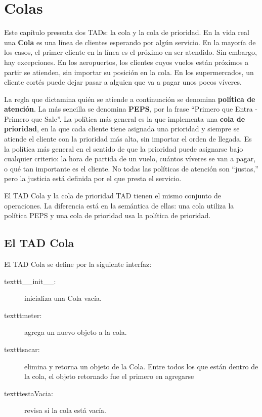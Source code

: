 
\chapter{Colas}

\label{Cola}   
  

Este capítulo presenta dos TADs: la cola y la cola de prioridad. En
la vida real una \textbf{Cola} es una línea de clientes esperando
por algún servicio. En la mayoría de los casos, el primer cliente
en la línea es el próximo en ser atendido. Sin embargo, hay excepciones.
En los aeropuertos, los clientes cuyos vuelos están próximos a partir
se atienden, sin importar su posición en la cola. En los supermercados,
un cliente cortés puede dejar pasar a alguien que va a pagar unos
pocos víveres.

La regla que dictamina quién se atiende a continuación se denomina
\textbf{política de atención}. La más sencilla se denomina \textbf{PEPS},
por la frase ``Primero que Entra - Primero que Sale''. La política
más general es la que implementa una \textbf{cola de prioridad}, en
la que cada cliente tiene asignada una prioridad y siempre se atiende
el cliente con la prioridad más alta, sin importar el orden de llegada.
Es la política más general en el sentido de que la prioridad puede
asignarse bajo cualquier criterio: la hora de partida de un vuelo,
cuántos víveres se van a pagar, o qué tan importante es el cliente.
No todas las políticas de atención son ``justas,'' pero la justicia
está definida por el que presta el servicio.

El TAD Cola y la cola de prioridad TAD tienen el mismo conjunto de
operaciones. La diferencia está en la semántica de ellas: una cola
utiliza la política PEPS y una cola de prioridad usa la política de
prioridad.


\section{El TAD Cola}

  

El TAD Cola se define por la siguiente interfaz:
\begin{description}
\item [{texttt{\_\_init\_\_}:}] inicializa una Cola vacía.
\item [{texttt{meter}:}] agrega un nuevo objeto a la cola.
\item [{texttt{sacar}:}] elimina y retorna un objeto de la Cola. Entre
todos los que están dentro de la cola, el objeto retornado fue el
primero en agregarse
\item [{texttt{estaVacia}:}] revisa si la cola está vacía.
\end{description}

